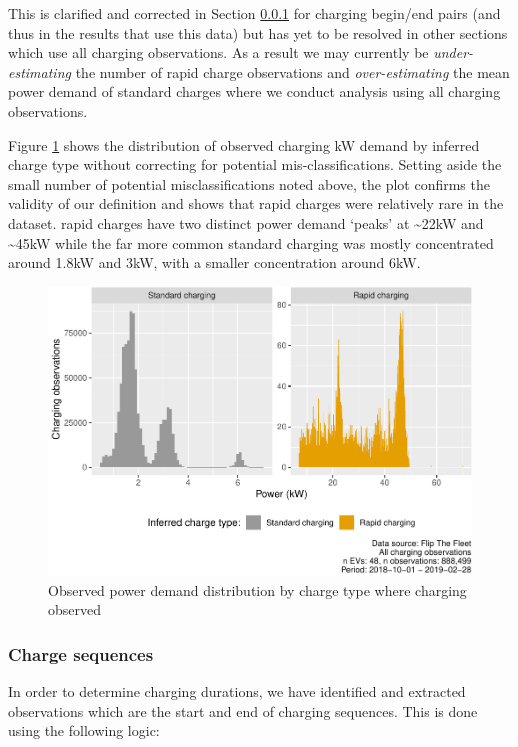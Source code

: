 \documentclass[]{article}
\begin{document}
This is clarified and corrected in Section \ref{codeSequences} for charging begin/end pairs (and thus in the results that use this data) but has yet to be resolved in other sections which use all charging observations. As a result we may currently be \emph{under-estimating} the number of rapid charge observations and \emph{over-estimating} the mean power demand of standard charges where we conduct analysis using all charging observations.

Figure \ref{fig:obsPower} shows the distribution of observed charging kW demand by inferred charge type without correcting for potential mis-classifications. Setting aside the small number of potential misclassifications noted above, the plot confirms the validity of our definition and shows that rapid charges were relatively rare in the dataset. rapid charges have two distinct power demand `peaks' at \textasciitilde22kW and \textasciitilde45kW while the far more common standard charging was mostly concentrated around 1.8kW and 3kW, with a smaller concentration around 6kW.

\begin{figure}
\centering
\includegraphics{EVBB_report_v1_files/figure-latex/obsPower-1.pdf}
\caption{\label{fig:obsPower}Observed power demand distribution by charge type where charging observed}
\end{figure}

\hypertarget{codeSequences}{%
\subsubsection{Charge sequences}\label{codeSequences}}

In order to determine charging durations, we have identified and extracted observations which are the start and end of charging sequences. This is done using the following logic:
\end{document}
